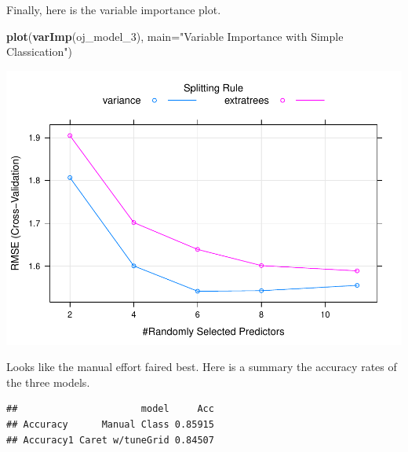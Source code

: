 \documentclass[
]{book}
\newenvironment{Shaded}{\begin{snugshade}}{\end{snugshade}}
\newcommand{\DataTypeTok}[1]{\textcolor[rgb]{0.13,0.29,0.53}{#1}}
\newcommand{\DecValTok}[1]{\textcolor[rgb]{0.00,0.00,0.81}{#1}}
\newcommand{\KeywordTok}[1]{\textcolor[rgb]{0.13,0.29,0.53}{\textbf{#1}}}
\newcommand{\NormalTok}[1]{#1}
\newcommand{\OperatorTok}[1]{\textcolor[rgb]{0.81,0.36,0.00}{\textbf{#1}}}
\newcommand{\StringTok}[1]{\textcolor[rgb]{0.31,0.60,0.02}{#1}}
\begin{document}
Finally, here is the variable importance plot.

\begin{Shaded}
\begin{Highlighting}[]
\KeywordTok{plot}\NormalTok{(}\KeywordTok{varImp}\NormalTok{(oj_model_}\DecValTok{3}\NormalTok{), }\DataTypeTok{main=}\StringTok{"Variable Importance with Simple Classication"}\NormalTok{)}
\end{Highlighting}
\end{Shaded}

\includegraphics{data-sci_files/figure-latex/unnamed-chunk-82-1.pdf}

Looks like the manual effort faired best. Here is a summary the accuracy rates of the three models.

\begin{Shaded}
\end{Shaded}

\begin{verbatim}
##                      model     Acc
## Accuracy      Manual Class 0.85915
## Accuracy1 Caret w/tuneGrid 0.84507
\end{verbatim}
\end{document}
